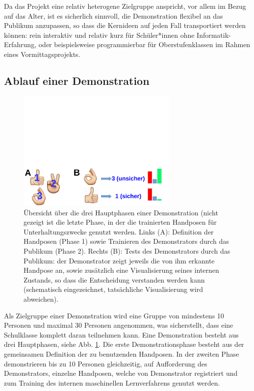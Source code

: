 \documentclass[11pt]{article}
\begin{document}
Da das Projekt eine relativ heterogene Zielgruppe anspricht, vor allem im Bezug auf das Alter, ist es sicherlich sinnvoll, die Demonstration flexibel an das Publikum anzupassen, so dass die Kernideen auf jeden Fall transportiert werden können:
rein interaktiv und relativ kurz für Schüler*innen ohne Informatik-Erfahrung, oder beispielsweise programmierbar für Oberstufenklassen im Rahmen eines Vormittagsprojekts.
%
\subsection {Ablauf einer Demonstration}
%
\begin{figure}[t!]
\centering
\includegraphics[viewport=0in 0in 11in 2.8in,width=0.7\textwidth,clip]{phases.pdf}
\caption{\label{fig:phases}
Übersicht über die drei Hauptphasen einer Demonstration (nicht gezeigt ist die letzte Phase, in der die trainierten Handposen für Unterhaltungszwecke genutzt werden. Links (A): Definition der Handposen (Phase 1) sowie Trainieren des Demonstrators durch das Publikum (Phase 2). Rechts (B): Tests des Demonstrators durch das Publikum: der Demonstrator zeigt jeweils die von ihm erkannte Handpose an, sowie zusätzlich eine Visualisierung seines internen Zustands, so dass die Entscheidung verstanden werden kann (schematisch eingezeichnet, tatsächliche Visualisierung wird abweichen).
}
\end{figure}
%
Als Zielgruppe einer Demonstration wird eine Gruppe von mindestens 10 Personen und maximal 30 Personen angenommen, was sicherstellt, dass eine Schulklasse komplett daran teilnehmen kann.
Eine Demonstration besteht aus drei Hauptphasen, siehe Abb. \ref{fig:phases}.
Die erste Demonstrationsphase besteht aus der gemeinsamen Definition der zu benutzenden Handposen.
In der zweiten Phase demonstrieren bis zu 10 Personen gleichzeitig, auf Aufforderung des Demonstrators, einzelne Handposen, welche von Demonstrator registriert und zum Training des internen maschinellen Lernverfahrens genutzt werden.
\end{document}
